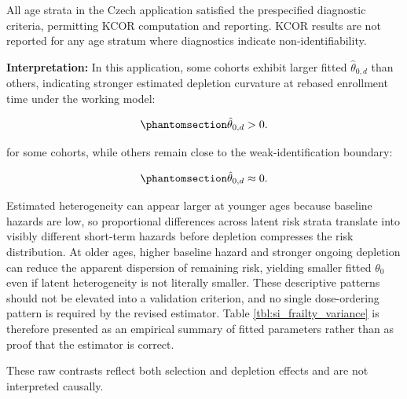 \documentclass[
]{article}
\begin{document}
All age strata in the Czech application satisfied the prespecified
diagnostic criteria, permitting KCOR computation and reporting. KCOR
results are not reported for any age stratum where diagnostics indicate
non-identifiability.

\textbf{Interpretation:} In this application, some cohorts exhibit
larger fitted \(\hat{\theta}_{0,d}\) than others, indicating stronger
estimated depletion curvature at rebased enrollment time under the
working model:

\begin{equation}\protect\phantomsection\label{eq:si_theta_positive}{
\hat{\theta}_{0,d} > 0.
}\end{equation}

for some cohorts, while others remain close to the weak-identification
boundary:

\begin{equation}\protect\phantomsection\label{eq:si_theta_near_zero_dose2}{
\hat{\theta}_{0,d} \approx 0.
}\end{equation}

Estimated heterogeneity can appear larger at younger ages because
baseline hazards are low, so proportional differences across latent risk
strata translate into visibly different short-term hazards before
depletion compresses the risk distribution. At older ages, higher
baseline hazard and stronger ongoing depletion can reduce the apparent
dispersion of remaining risk, yielding smaller fitted \(\theta_0\) even
if latent heterogeneity is not literally smaller. These descriptive
patterns should not be elevated into a validation criterion, and no
single dose-ordering pattern is required by the revised estimator. Table
\ref{tbl:si_frailty_variance} is therefore presented as an empirical
summary of fitted parameters rather than as proof that the estimator is
correct.

These raw contrasts reflect both selection and depletion effects and are
not interpreted causally.

\newpage
\end{document}
